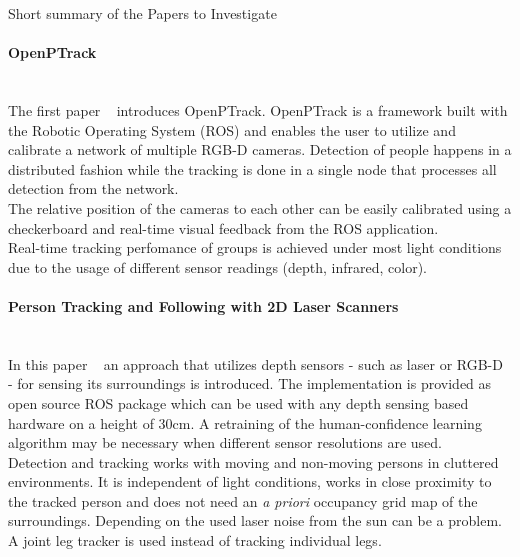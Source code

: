 \documentclass[a4paper,oneside,10pt,DIV12,headsepline,footexclude,headexclude]{scrartcl}
\begin{document}
\begin{section}{Short summary of the Papers to Investigate}

\paragraph{OpenPTrack}\mbox{} \\
The first paper ~\cite{munaro2014openptrack} introduces OpenPTrack. OpenPTrack
is a framework built with the Robotic Operating System (ROS) and enables the user
to utilize and calibrate a network of multiple RGB-D cameras. Detection of people
happens in a distributed fashion while the tracking is done in a single node that
processes all detection from the network.\\
The relative position of the cameras to each other can be easily calibrated using 
a checkerboard and real-time visual feedback from the ROS application.\\
Real-time tracking perfomance of groups is achieved under most light conditions
due to the usage of different sensor readings (depth, infrared, color). 

\paragraph{Person Tracking and Following with 2D Laser Scanners}
\mbox{} \\
In this paper ~\cite{7139259} an approach that utilizes depth sensors - such as
laser or RGB-D - for sensing its surroundings is introduced. The implementation
is provided as open source ROS package which can be used with any depth sensing
based hardware on a height of 30cm. A retraining of the human-confidence 
learning algorithm may be necessary when different sensor resolutions are used.\\

Detection and tracking works with moving and non-moving persons in cluttered 
environments. It is independent of light conditions, works in close proximity
to the tracked person and does not need an \textit{a priori} occupancy grid map 
of the surroundings. Depending on the used laser noise from the sun can be a 
problem.
A joint leg tracker is used instead of tracking individual legs.

%
%
%
%
 


\end{section}
\end{document}
